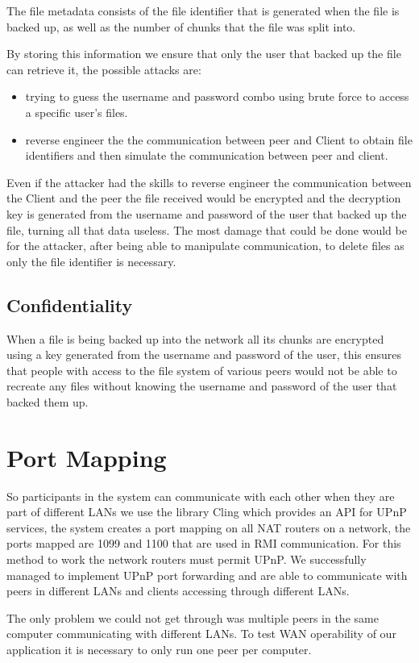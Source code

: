 \documentclass[11pt]{article}
\begin{document}
The file metadata consists of the file identifier that is generated when the file is backed up, as well as the number of chunks that the file was split into.

By storing this information we ensure that only the user that backed up the file can retrieve it, the possible attacks are:
\begin{itemize}
\item trying to guess the username and password combo using brute force to access a specific user's files.
\item reverse engineer the the communication between peer and Client to obtain file identifiers and then simulate the communication between peer and client.
\end{itemize}

Even if the attacker had the skills to reverse engineer the communication between the Client and the peer the file received would be encrypted and the decryption key is generated from the username and password of the user that backed up the file, turning all that data useless. The most damage that could be done would be for the attacker, after being able to manipulate communication, to delete files as only the file identifier is necessary. 
\subsection{Confidentiality}
When a file is being backed up into the network all its chunks are encrypted using a key generated from the username and password of the user, this ensures that people with access to the file system of various peers would not be able to recreate any files without knowing the username and password of the user that backed them up.


\section{Port Mapping}
So participants in the system can communicate with each other when they are part of different LANs we use the library Cling which provides an API for UPnP services, the system creates a port mapping on all NAT routers on a network, the ports mapped are 1099 and 1100 that are used in RMI communication. For this method to work the network routers must permit UPnP.
We successfully managed to implement UPnP port forwarding and are able to communicate with peers in different LANs and clients accessing through different LANs.

The only problem we could not get through was multiple peers in the same computer communicating with different LANs. To test WAN operability of our application it is necessary to only run one peer per computer. 
\end{document}
